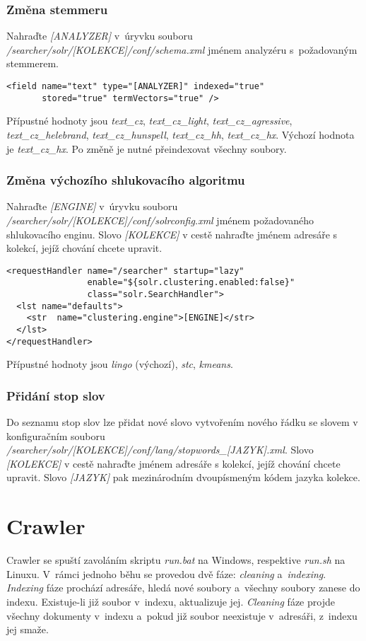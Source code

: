 \subsubsection{Změna stemmeru}
Nahraďte \emph{[ANALYZER]} v~úryvku souboru \\ \emph{/searcher/solr/[KOLEKCE]/conf/schema.xml} jménem analyzéru s~požadovaným stemmerem.
\begin{verbatim}
<field name="text" type="[ANALYZER]" indexed="true" 
       stored="true" termVectors="true" />
\end{verbatim}
Přípustné hodnoty jsou \emph{text\_cz}, \emph{text\_cz\_light}, \emph{text\_cz\_agressive}, \\ \emph{text\_cz\_helebrand}, \emph{text\_cz\_hunspell}, \emph{text\_cz\_hh}, \emph{text\_cz\_hx}. Výchozí hodnota je \emph{text\_cz\_hx}. Po změně je nutné přeindexovat všechny soubory.

\subsubsection{Změna výchozího shlukovacího algoritmu}
Nahraďte \emph{[ENGINE]} v~úryvku souboru \\ \emph{/searcher/solr/[KOLEKCE]/conf/solrconfig.xml} jménem požadovaného shlukovacího enginu. Slovo \emph{[KOLEKCE]} v cestě nahraďte jménem adresáře s kolekcí, jejíž chování chcete upravit.
\begin{verbatim}
<requestHandler name="/searcher" startup="lazy"
                enable="${solr.clustering.enabled:false}"
                class="solr.SearchHandler">
  <lst name="defaults">
    <str  name="clustering.engine">[ENGINE]</str>
  </lst>
</requestHandler>
\end{verbatim}
Přípustné hodnoty jsou \emph{lingo} (výchozí), \emph{stc}, \emph{kmeans}.

\subsubsection{Přidání stop slov}
Do seznamu stop slov lze přidat nové slovo vytvořením nového řádku se slovem v konfiguračním souboru \\ \emph{/searcher/solr/[KOLEKCE]/conf/lang/stopwords\_[JAZYK].xml}. Slovo \emph{[KOLEKCE]} v cestě nahraďte jménem adresáře s kolekcí, jejíž chování chcete upravit. Slovo \emph{[JAZYK]} pak mezinárodním dvoupísmeným kódem jazyka kolekce.

\section{Crawler}
Crawler se spuští zavoláním skriptu \emph{run.bat} na Windows, respektive \emph{run.sh} na Linuxu. V~rámci jednoho běhu se provedou dvě fáze: \emph{cleaning} a~\emph{indexing}. \emph{Indexing} fáze prochází adresáře, hledá nové soubory a~všechny soubory zanese do indexu. Existuje-li již soubor v~indexu, aktualizuje jej. \emph{Cleaning} fáze projde všechny dokumenty v~indexu a~pokud již soubor neexistuje v~adresáři, z~indexu jej smaže. 

